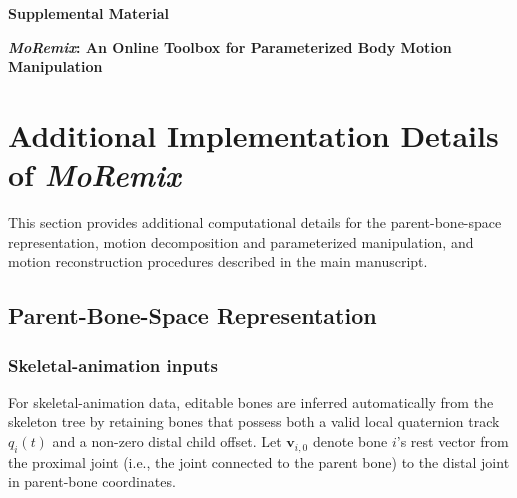 \documentclass[12pt]{article}
\begin{document}

\begin{center}

{\Large\bfseries Supplemental Material}

\vspace{1em}

{\large\bfseries
\textit{MoRemix}: An Online Toolbox for Parameterized Body Motion Manipulation
}

\vspace{1em}




\end{center}

\vspace{1.5em}


\section{Additional Implementation Details of \textit{MoRemix}}
\label{sup:implementation}

This section provides additional computational details for the
parent-bone-space representation, motion decomposition and parameterized
manipulation, and motion reconstruction procedures described in the
main manuscript.


\subsection{Parent-Bone-Space Representation}
\label{sup:parent-space}

\subsubsection{Skeletal-animation inputs}
\label{sup:skeletal-input}

For skeletal-animation data, editable bones are inferred automatically
from the skeleton tree by retaining bones that possess both a valid local
quaternion track $q_i(t)$ and a non-zero distal child offset.
Let $\mathbf{v}_{i,0}$ denote bone $i$'s rest vector from the proximal
joint (i.e., the joint connected to the parent bone) to the distal joint
in parent-bone coordinates.
\end{document}
